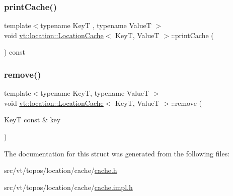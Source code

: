 \mbox{\label{structvt_1_1location_1_1_location_cache_a0c8f06fd5c1ff26c30c0c25b5800ba30}} 
\subsubsection{\texorpdfstring{print\+Cache()}{printCache()}}
{\footnotesize\ttfamily template$<$typename KeyT , typename ValueT $>$ \\
void \hyperlink{structvt_1_1location_1_1_location_cache}{vt\+::location\+::\+Location\+Cache}$<$ KeyT, ValueT $>$\+::print\+Cache (\begin{DoxyParamCaption}{ }\end{DoxyParamCaption}) const}

\mbox{\label{structvt_1_1location_1_1_location_cache_ac39441e200c3c3023bda193f7075f372}} 
\subsubsection{\texorpdfstring{remove()}{remove()}}
{\footnotesize\ttfamily template$<$typename KeyT, typename ValueT $>$ \\
void \hyperlink{structvt_1_1location_1_1_location_cache}{vt\+::location\+::\+Location\+Cache}$<$ KeyT, ValueT $>$\+::remove (\begin{DoxyParamCaption}\item[{KeyT const \&}]{key }\end{DoxyParamCaption})}



The documentation for this struct was generated from the following files\+:\begin{DoxyCompactItemize}
\item 
src/vt/topos/location/cache/\hyperlink{topos_2location_2cache_2cache_8h}{cache.\+h}\item 
src/vt/topos/location/cache/\hyperlink{cache_8impl_8h}{cache.\+impl.\+h}\end{DoxyCompactItemize}
